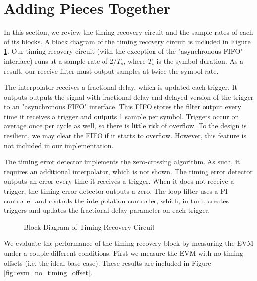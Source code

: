 \documentclass{article}
\begin{document}
\section{Adding Pieces Together}

In this section, we review the timing recovery circuit and the sample rates of each of its blocks. A block diagram of the timing recovery circuit is included in Figure \ref{fig::timing_recovery_block_diagram_2}. Our timing recovery circuit (with the exception of the "asynchronous FIFO" interface) runs at a sample rate of $2/T_s$, where $T_s$ is the symbol duration. As a result, our receive filter must output samples at twice the symbol rate.

	The interpolator receives a fractional delay, which is updated each trigger. It outputs outputs the signal with fractional delay and delayed-version of the trigger to an "asynchronous FIFO" interface. This FIFO stores the filter output every time it receives a trigger and outputs 1 sample per symbol. Triggers occur on average once per cycle as well, so there is little risk of overflow. To the design is resilient, we may clear the FIFO if it starts to overflow. However, this feature is not included in our implementation.
	
	The timing error detector implements the zero-crossing algorithm. As such, it requires an additional interpolator, which is not shown. The timing error detector outputs an error every time it receives a trigger. When it does not receive a trigger, the timing error detector outputs a zero. The loop filter uses a PI controller and controls the interpolation controller, which, in turn, creates triggers and updates the fractional delay parameter on each trigger.
	
\begin{figure}[H]
	\centerline{}
	\caption{Block Diagram of Timing Recovery Circuit}
	\label{fig::timing_recovery_block_diagram_2}
\end{figure}

We evaluate the performance of the timing recovery block by measuring the EVM under a couple different conditions. First we measure the EVM with no timing offsets (i.e. the ideal base case). These results are included in Figure \ref{fig::evm_no_timing_offset}.
\end{document}

